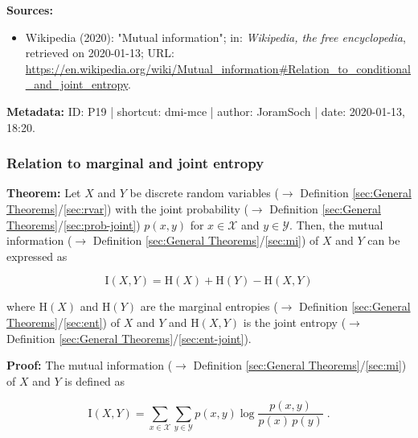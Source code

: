 \documentclass[a4paper,12pt,twoside]{book}
\begin{document}
\vspace{1em}
\textbf{Sources:}
\begin{itemize}
\item Wikipedia (2020): "Mutual information"; in: \textit{Wikipedia, the free encyclopedia}, retrieved on 2020-01-13; URL: \url{https://en.wikipedia.org/wiki/Mutual_information#Relation_to_conditional_and_joint_entropy}.
\end{itemize}


\vspace{1em}
\textbf{Metadata:} ID: P19 | shortcut: dmi-mce | author: JoramSoch | date: 2020-01-13, 18:20.
\vspace{1em}



\subsubsection[\textbf{Relation to marginal and joint entropy}]{Relation to marginal and joint entropy} \label{sec:dmi-mje}
\setcounter{equation}{0}

\textbf{Theorem:} Let $X$ and $Y$ be discrete random variables ($\rightarrow$ Definition \ref{sec:General Theorems}/\ref{sec:rvar}) with the joint probability ($\rightarrow$ Definition \ref{sec:General Theorems}/\ref{sec:prob-joint}) $p(x,y)$ for $x \in \mathcal{X}$ and $y \in \mathcal{Y}$. Then, the mutual information ($\rightarrow$ Definition \ref{sec:General Theorems}/\ref{sec:mi}) of $X$ and $Y$ can be expressed as

\begin{equation} \label{eq:dmi-mje-dmi-mje}
\mathrm{I}(X,Y) = \mathrm{H}(X) + \mathrm{H}(Y) - \mathrm{H}(X,Y)
\end{equation}

where $\mathrm{H}(X)$ and $\mathrm{H}(Y)$ are the marginal entropies ($\rightarrow$ Definition \ref{sec:General Theorems}/\ref{sec:ent}) of $X$ and $Y$ and $\mathrm{H}(X,Y)$ is the joint entropy ($\rightarrow$ Definition \ref{sec:General Theorems}/\ref{sec:ent-joint}).


\vspace{1em}
\textbf{Proof:} The mutual information ($\rightarrow$ Definition \ref{sec:General Theorems}/\ref{sec:mi}) of $X$ and $Y$ is defined as

\begin{equation} \label{eq:dmi-mje-MI}
\mathrm{I}(X,Y) = \sum_{x \in \mathcal{X}} \sum_{y \in \mathcal{Y}} p(x,y) \log \frac{p(x,y)}{p(x)\,p(y)} \; .
\end{equation}
\end{document}
